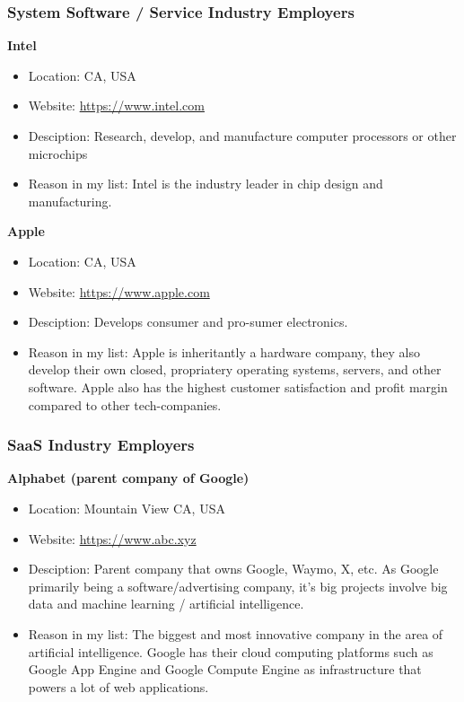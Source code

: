 \documentclass[10pt,letterpaper]{article}
\begin{document}
\subsubsection{System Software / Service Industry Employers}
\textbf{Intel}
\begin{itemize}
	\item Location: CA, USA
	\item Website: \url{https://www.intel.com}
	\item Desciption: Research, develop, and manufacture computer processors or other microchips
	\item Reason in my list: Intel is the industry leader in chip design and manufacturing.
\end{itemize}

\textbf{Apple}
\begin{itemize}
	\item Location: CA, USA
	\item Website: \url{https://www.apple.com}
	\item Desciption: Develops consumer and pro-sumer electronics. 
	\item Reason in my list: Apple is inheritantly a hardware company, they also develop their own closed, propriatery operating systems, servers, and other software. Apple also has the highest customer satisfaction and profit margin compared to other tech-companies.
\end{itemize}

\subsubsection{SaaS Industry Employers}

\textbf{Alphabet (parent company of Google)}
\begin{itemize}
	\item Location: Mountain View CA, USA
	\item Website: \url{https://www.abc.xyz}
	\item Desciption: Parent company that owns Google, Waymo, X, etc. As Google primarily being a software/advertising company, it's big projects involve big data and machine learning / artificial intelligence.
	\item Reason in my list: The biggest and most innovative company in the area of artificial intelligence. Google has their cloud computing platforms such as Google App Engine and Google Compute Engine as infrastructure that powers a lot of web applications.
\end{itemize}
\end{document}
